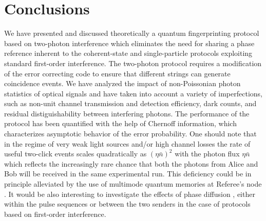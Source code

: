 \documentclass[10pt]{article}
\begin{document}
\section{Conclusions}
\label{Sec:Conclusions}

We have presented and discussed theoretically a quantum fingerprinting protocol based on two-photon interference which eliminates the need for sharing a phase reference inherent to the coherent-state \cite{Luthenhaus2014,Kumar} and single-particle protocols \cite{Massar} exploiting standard first-order interference. The two-photon protocol requires a modification of the error correcting code to ensure that different strings can generate coincidence events.  We have analyzed the impact of non-Poissonian photon statistics of optical signals and have taken into account a variety of imperfections, such as non-unit channel transmission and detection efficiency, dark counts, and residual distiguishability between interfering photons. The performance of the protocol has been quantified with the help of Chernoff information, which characterizes asymptotic behavior of the error probability.
One should note that in the regime of very weak light sources and/or high channel losses  the rate of useful two-click events scales quadratically as $(\eta\bar{n})^{2}$ with the photon flux $\eta\bar{n}$ which reflects the increasingly rare chance that both the photons from Alice and Bob will be received in the same experimental run. This deficiency could be in principle alleviated by the use of multimode quantum memories at Referee's node \cite{Chrapkiewicz}. It would be also interesting to investigate the effects of phase diffusion \cite{Olivares}, either within the pulse sequences or between the two senders in the case of protocols based on first-order interference.
\end{document}
